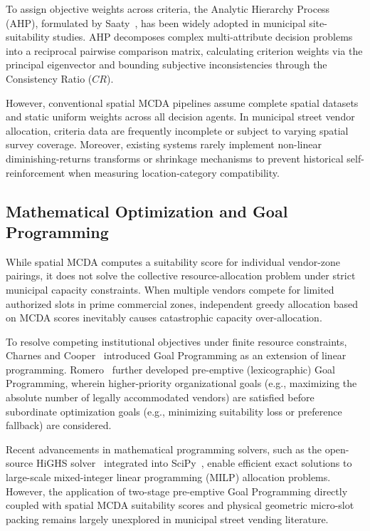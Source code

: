 To assign objective weights across criteria, the Analytic Hierarchy Process (AHP), formulated by Saaty~\cite{saaty1980analytic, saaty1990how}, has been widely adopted in municipal site-suitability studies. AHP decomposes complex multi-attribute decision problems into a reciprocal pairwise comparison matrix, calculating criterion weights via the principal eigenvector and bounding subjective inconsistencies through the Consistency Ratio ($CR$). 

However, conventional spatial MCDA pipelines assume complete spatial datasets and static uniform weights across all decision agents. In municipal street vendor allocation, criteria data are frequently incomplete or subject to varying spatial survey coverage. Moreover, existing systems rarely implement non-linear diminishing-returns transforms or shrinkage mechanisms to prevent historical self-reinforcement when measuring location-category compatibility.

\subsection{Mathematical Optimization and Goal Programming}
\label{sec:lit_optimization}

While spatial MCDA computes a suitability score for individual vendor-zone pairings, it does not solve the collective resource-allocation problem under strict municipal capacity constraints. When multiple vendors compete for limited authorized slots in prime commercial zones, independent greedy allocation based on MCDA scores inevitably causes catastrophic capacity over-allocation.

To resolve competing institutional objectives under finite resource constraints, Charnes and Cooper~\cite{charnes1977goal} introduced Goal Programming as an extension of linear programming. Romero~\cite{romero1991handbook} further developed pre-emptive (lexicographic) Goal Programming, wherein higher-priority organizational goals (e.g., maximizing the absolute number of legally accommodated vendors) are satisfied before subordinate optimization goals (e.g., minimizing suitability loss or preference fallback) are considered. 

Recent advancements in mathematical programming solvers, such as the open-source HiGHS solver~\cite{huang2023highs} integrated into SciPy~\cite{virtanen2020scipy}, enable efficient exact solutions to large-scale mixed-integer linear programming (MILP) allocation problems. However, the application of two-stage pre-emptive Goal Programming directly coupled with spatial MCDA suitability scores and physical geometric micro-slot packing remains largely unexplored in municipal street vending literature.

